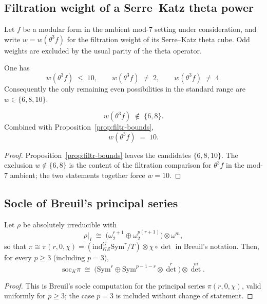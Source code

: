 \subsection{Filtration weight of a Serre--Katz theta power}
Let $f$ be a modular form in the ambient mod-$7$ setting under consideration, and write $w=w(\theta^3 f)$ for the filtration weight of its Serre--Katz theta cube. Odd weights are excluded by the usual parity of the theta operator.

\begin{proposition}\label{prop:filtr-bounds}
One has
\[
w(\theta^3 f)\;\le\;10,\qquad w(\theta^3 f)\;\neq\;2,\qquad w(\theta^3 f)\;\neq\;4.
\]
Consequently the only remaining even possibilities in the standard range are $w\in\{6,8,10\}$.
\end{proposition}

\begin{theorem}\label{thm:filtr-10}
\[
w(\theta^3 f)\;\notin\;\{6,8\}.
\]
Combined with Proposition~\ref{prop:filtr-bounds},
\[
w(\theta^3 f)\;=\;10.
\]
\end{theorem}
\begin{proof}
Proposition~\ref{prop:filtr-bounds} leaves the candidates $\{6,8,10\}$. The exclusion $w\notin\{6,8\}$ is the content of the filtration comparison for $\theta^3 f$ in the mod-$7$ ambient; the two statements together force $w=10$.
\end{proof}

\subsection{Socle of Breuil's principal series}
\begin{theorem}\label{thm:breuil-soc}
Let $\rho$ be absolutely irreducible with
\[
\rho\big|_I \;\cong\; \bigl(\omega_2^{r+1}\oplus\omega_2^{p(r+1)}\bigr)\otimes\omega^m,
\]
so that $\pi\cong\pi(r,0,\chi)=(\mathrm{ind}_{KZ}^G\mathrm{Sym}^r/T)\otimes\chi\circ\det$ in Breuil's notation. Then, for every $p\ge3$ (including $p=3$),
\[
\mathrm{soc}_K\pi \;\cong\; \bigl(\mathrm{Sym}^r \oplus \mathrm{Sym}^{p-1-r}\otimes\det^r\bigr)\otimes\det^m.
\]
\end{theorem}
\begin{proof}
This is Breuil's socle computation for the principal series $\pi(r,0,\chi)$, valid uniformly for $p\ge3$; the case $p=3$ is included without change of statement.
\end{proof}

